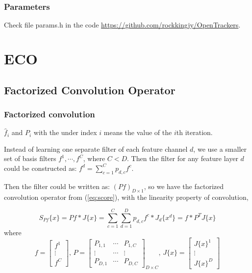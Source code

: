 \documentclass[12pt]{article}
\numberwithin{equation}{section}
\begin{document}
\subsubsection{Parameters}
Check file params.h in the code \url{https://github.com/rockkingjy/OpenTrackers}. 
\section{ECO \cite{DanelljanCVPR2017}} 
\subsection{Factorized Convolution Operator}
\subsubsection{Factorized convolution}
$\hat{f}_i$ and $P_i$ with the under index $i$ means the value of the $i$th iteration. \par
Instead of learning one separate filter of each feature channel $d$, we use a smaller set of basis filters 
$f^1, \cdots, f^C$, where $C < D$. Then the filter for any feature layer $d$ could be constructed as: 
$f^d = \sum^C_{c=1} p_{d,c}f^c$. \par
Then the filter could be written as: $(Pf)_{D \times 1}$, so we have 
the factorized convolution operator from (\ref{eq:score}), with the linearity property of convolution, \par
\begin{equation}
	S_{Pf}\{x\}= Pf*J\{x\}=\sum^C_{c=1} \sum^D_{d=1} p_{d,c} f^c * J_d\{x^d\} = f*P^TJ\{x\}
\end{equation} 
where 
\begin{equation}
	f = 
	\begin{bmatrix}
		f^1 \\ \vdots \\ f^C
	\end{bmatrix}
	\text{, }
	P = 
	\begin{bmatrix}
		P_{1,1} & \cdots & P_{1,C} \\
		\vdots & \cdots & \vdots \\
		P_{D,1} & \cdots & P_{D,C} 
	\end{bmatrix}_{D \times C}
	\text{, }
	J\{x\} = 
	\begin{bmatrix}
		J\{x\}^1 \\ \vdots \\ J\{x\}^D
	\end{bmatrix}
\end{equation}
\end{document}
